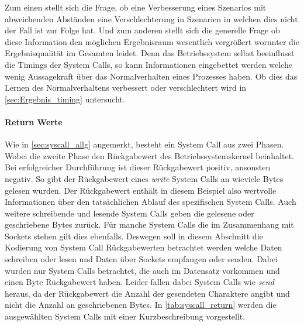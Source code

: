                     Zum einen stellt sich die Frage, ob eine Verbesserung eines Szenarios mit abweichenden Abständen eine Verschlechterung in Szenarien in welchen dies nicht der Fall ist zur Folge hat.
                    Und zum anderen stellt sich die generelle Frage ob diese Information den möglichen Ergebnisraum wesentlich vergrößert worunter die Ergebnisqualität im Gesamten leidet.
                    Denn das Betriebssystem selbst beeinflusst die Timings der System Calls, so kann Informationen eingebettet werden welche wenig Aussagekraft über das Normalverhalten eines Prozesses haben.
                    Ob dies das Lernen des Normalverhaltens verbessert oder verschlechtert wird in \autoref{sec:Ergebnis_timing} untersucht.

                \paragraph{Return Werte}

                    Wie in \autoref{sec:syscall_allg} angemerkt, besteht ein System Call aus zwei \glqq Phasen\grqq.
                    Wobei die zweite Phase den Rückgabewert des Betriebssystemskernel beinhaltet.
                    Bei erfolgreicher Durchführung ist dieser Rückgabewert positiv, ansonsten negativ.
                    So gibt der Rückgabewert eines \textit{write} System Calls an wieviele Bytes gelesen wurden.
                    Der Rückgabewert enthält in diesem Beispiel also wertvolle Informationen über den tatsächlichen Ablauf des spezifischen System Calls.
                    Auch weitere schreibende und lesende System Calls geben die gelesene oder geschriebene Bytes zurück.
                    Für manche System Calls die im Zusammenhang mit Sockets stehen gilt dies ebenfalls.
                    Deswegen soll in diesem Abschnitt die Kodierung von System Call Rückgabewerten betrachtet werden welche Daten schreiben oder lesen und Daten über Sockets empfangen oder senden. 
                    Dabei wurden nur System Calls betrachtet, die auch im Datensatz vorkommen und einen Byte Rückgabewert haben.
                    Leider fallen dabei System Calls wie \textit{send} heraus, da der Rückgabewert die Anzahl der gesendeten Charaktere angibt und nicht die Anzahl an geschriebenen Bytes.
                    In \autoref{tab:syscall_return} werden die ausgewählten System Calls mit einer Kurzbeschreibung vorgestellt.

